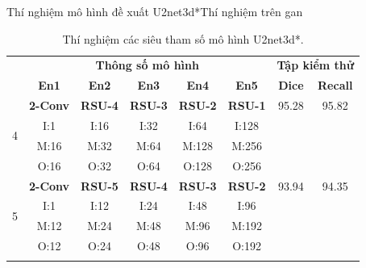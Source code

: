 \documentclass[
	10pt,                %
	aspectratio=169,     %
]{beamer}
\begin{document}
	\begin{frame}{Thí nghiệm mô hình đề xuất U2net3d*}{Thí nghiệm trên gan}
	\begin{table}[H]
        \centering
        \begin{tabular}{c|c c c c c | c c}
        \Xhline{3\arrayrulewidth}
            \multirow{2}{*}{\textbf{STT}} & \multicolumn{5}{c|}{\textbf{Thông số mô hình}} & \multicolumn{2}{c}{\textbf{Tập kiểm thử}} \\
            & \textbf{En1} & \textbf{En2} & \textbf{En3} & \textbf{En4} & \textbf{En5} & \textbf{Dice} & \textbf{Recall} \\ 
            \hline
            \multirow{4}{*}{4} & \textbf{2-Conv} & \textbf{RSU-4} & \textbf{RSU-3} & \textbf{RSU-2} &  \textbf{RSU-1}  & 95.28 & 95.82 \\
                                          & I:1  & I:16 & I:32 & I:64  & I:128 \\ 
                                          & M:16 & M:32 & M:64 & M:128 & M:256 \\
                                          & O:16 & O:32 & O:64 & O:128 & O:256 \\
            \hline
            \multirow{4}{*}{5} & \textbf{2-Conv} & \textbf{RSU-5} & \textbf{RSU-4} & \textbf{RSU-3} &  \textbf{RSU-2}  & 93.94 & 94.35 \\
                                          & I:1  & I:12 & I:24 & I:48  & I:96 \\ 
                                          & M:12 & M:24 & M:48 & M:96 & M:192 \\
                                          & O:12 & O:24 & O:48 & O:96 & O:192 \\
            \hline
    
        \Xhline{3\arrayrulewidth}
        \end{tabular}
        \caption{Thí nghiệm các siêu tham số mô hình U2net3d*.}
    \end{table}
	\end{frame}
	
\end{document}

